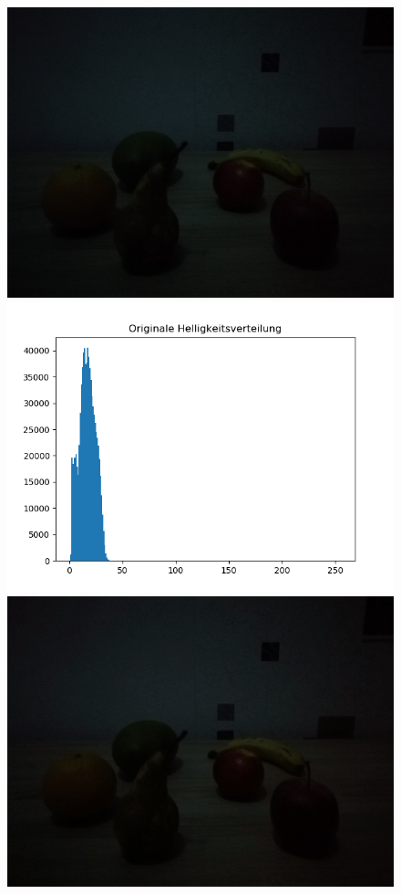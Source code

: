\documentclass[a4paper,12pt,oneside]{article}
\begin{document}
\begin{figure}[htbp]
\center
\begin{minipage}{0.49\textwidth}
\includegraphics[width=.8\textwidth]{Sources/Anhang/resize_0250.jpg}
\end{minipage}
\begin{minipage}{0.49\textwidth}
\includegraphics[width=\textwidth]{Sources/Anhang/resize_0250.png}
\end{minipage}
\begin{minipage}{0.49\textwidth}
\includegraphics[width=.8\textwidth]{Sources/Anhang/resize_0250_GW.jpg}

\end{minipage}
\end{figure}
\end{document}
